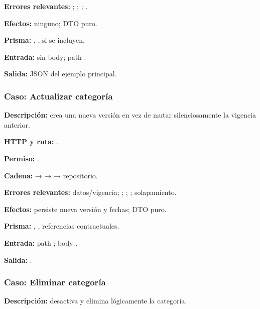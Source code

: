 \textbf{Errores relevantes:} \texttt{}; \texttt{}; \texttt{}; \texttt{}.  

\textbf{Efectos:} ninguno; DTO puro.  

\textbf{Prisma:} \texttt{}, \texttt{}, \texttt{} si se incluyen.  

\textbf{Entrada:} sin body; path \texttt{}.  

\textbf{Salida:} JSON del ejemplo principal.


\subsubsection{Caso: Actualizar categoría}


\textbf{Descripción:} crea una nueva versión en vez de mutar silenciosamente la vigencia anterior.  

\textbf{HTTP y ruta:} \texttt{}.  

\textbf{Permiso:} \texttt{}.  

\textbf{Cadena:} \texttt{} → \texttt{} → \texttt{} → repositorio.  

\textbf{Errores relevantes:} \texttt{} datos/vigencia; \texttt{}; \texttt{}; \texttt{}; solapamiento.  

\textbf{Efectos:} persiste nueva versión y fechas; DTO puro.  

\textbf{Prisma:} \texttt{}, \texttt{}, referencias contractuales.  

\textbf{Entrada:} path \texttt{}; body \texttt{}.  

\textbf{Salida:} \texttt{}.


\subsubsection{Caso: Eliminar categoría}


\textbf{Descripción:} desactiva y elimina lógicamente la categoría.  

